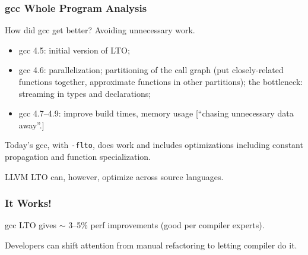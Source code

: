 \begin{frame}
\frametitle{gcc Whole Program Analysis}

{\Large How did gcc get better?  Avoiding unnecessary work. }

\begin{itemize}
\item gcc 4.5: initial version of LTO;
\item gcc 4.6: parallelization; partitioning of the call graph (put closely-related functions together, approximate functions in other partitions); the bottleneck: streaming in types and declarations;
\item gcc 4.7--4.9: improve build times, memory usage [``chasing unnecessary data away''.]
\end{itemize}

Today's gcc, with {\tt -flto}, does work and includes
optimizations including constant propagation and function
specialization.

LLVM LTO can, however, optimize across source languages.

\end{frame}



\begin{frame}
\frametitle{It Works!}

\Large


gcc LTO gives $\sim$ 3--5\% perf improvements (good per compiler experts).


Developers can shift attention from 
manual refactoring to letting compiler do it.

\end{frame}





